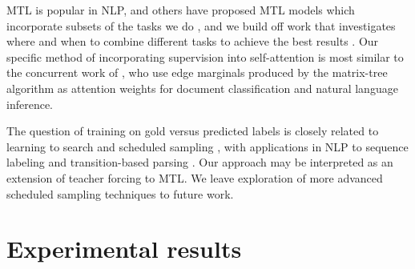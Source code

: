 \documentclass[11pt,a4paper]{article}
\begin{document}
MTL \citep{caruana1993multitask} is popular in NLP, and others have proposed MTL models which incorporate subsets of the tasks we do \citep{collobert2011natural, zhang2016stack, hashimoto2017joint, peng2017deep, swayamdipta2017}, and we build off work that investigates where and when to combine different tasks to achieve the best results \citep{sogaard2016deep, bingel2017identifying, alonso2017when}. Our specific method of incorporating supervision into self-attention is most similar to the concurrent work of \citet{liu2018learning}, who use edge marginals produced by the matrix-tree algorithm as attention weights for document classification and natural language inference.



The question of training on gold versus predicted labels is closely related to learning to search \citep{daume2009search,ross2011reduction,chang2015learning} and scheduled sampling \citep{bengio2015scheduled}, with applications in NLP to sequence labeling and transition-based parsing \citep{choi2011getting, goldberg2012dynamic,ballesteros2016training}. Our approach may be interpreted as an extension of teacher forcing \citep{williams1989learning} to MTL. We leave exploration of more advanced scheduled sampling techniques to future work. 


\section{Experimental results}
\end{document}
